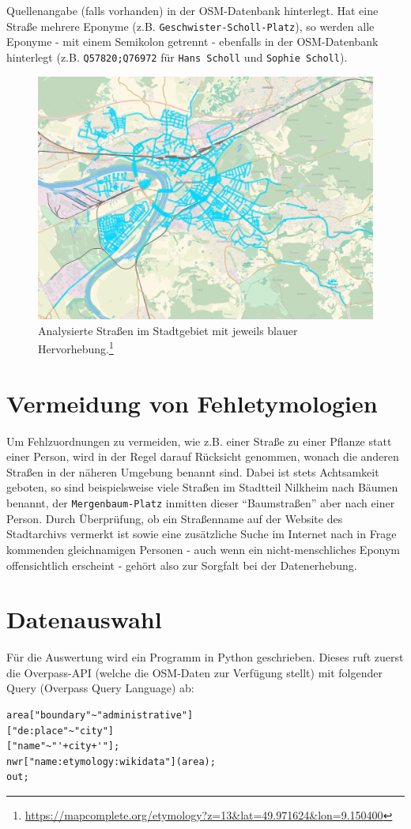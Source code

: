 \documentclass[ngerman,twocolumn,showpacs,%
  nofootinbib,aps,superscriptaddress,%
  eqsecnum,prd,notitlepage,showkeys,10pt,report]{revtex4-2}
\begin{document}
Quellenangabe (falls vorhanden) in der OSM-Datenbank hinterlegt. Hat eine Straße mehrere
Eponyme (z.B. \texttt{Geschwister-Scholl-Platz}), so werden alle Eponyme - mit einem Semikolon
getrennt - ebenfalls in der OSM-Datenbank hinterlegt (z.B. \texttt{Q57820;Q76972} für \texttt{Hans
Scholl} und \texttt{Sophie Scholl}).
\begin{figure}
    \centering
    \includegraphics[width=1\linewidth]{0.png}
    \caption{Analysierte Straßen im Stadtgebiet mit jeweils blauer Hervorhebung.\footnote{\url{https://mapcomplete.org/etymology?z=13&lat=49.971624&lon=9.150400}}}
    \label{fig:map}
\end{figure}

\section{Vermeidung von Fehletymologien}
Um Fehlzuordnungen zu vermeiden, wie z.B. einer Straße zu einer Pflanze statt einer
Person, wird in der Regel darauf Rücksicht genommen, wonach die anderen Straßen in der
näheren Umgebung benannt sind. Dabei ist stets Achtsamkeit geboten, so sind
beispielsweise viele Straßen im Stadtteil Nilkheim nach Bäumen benannt, der
\texttt{Mergenbaum-Platz} inmitten dieser “Baumstraßen” aber nach einer Person. Durch
Überprüfung, ob ein Straßenname auf der Website des Stadtarchivs vermerkt ist sowie eine
zusätzliche Suche im Internet nach in Frage kommenden gleichnamigen Personen - auch
wenn ein nicht-menschliches Eponym offensichtlich erscheint - gehört also zur Sorgfalt bei
der Datenerhebung.

\section{Datenauswahl}
Für die Auswertung wird ein Programm in Python geschrieben. Dieses ruft zuerst die
Overpass-API (welche die OSM-Daten zur Verfügung stellt) mit folgender Query (Overpass
Query Language) ab:
\begin{lstlisting}
area["boundary"~"administrative"]
["de:place"~"city"]
["name"~"'+city+'"];
nwr["name:etymology:wikidata"](area);
out;
\end{lstlisting}
\end{document}

